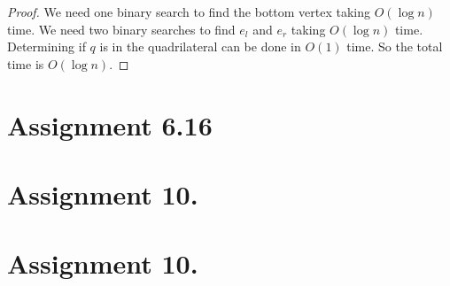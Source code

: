 \documentclass[10pt,a4paper,final,oneside,openany,article]{memoir}
\begin{document}
\begin{proof}
  We need one binary search to find the bottom vertex taking $O(\log n)$ time. We need two binary searches to find $e_l$ and $e_r$ taking $O(\log n)$ time. Determining if $q$ is in the quadrilateral can be done in $O(1)$ time. So the total time is $O(\log n)$.
\end{proof}


\chapter*{Assignment 6.16}

\chapter*{Assignment 10.}

\chapter*{Assignment 10.}
\end{document}
